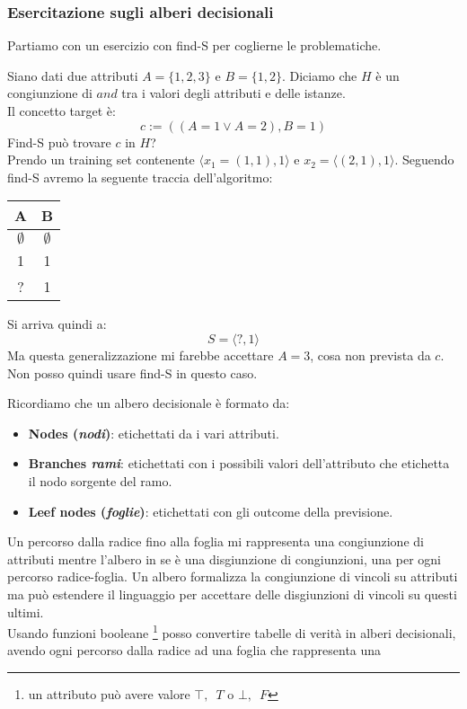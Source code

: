 \subsubsection{Esercitazione sugli alberi decisionali}
Partiamo con un esercizio con find-S per coglierne le problematiche.
\begin{esercizio}
  Siano dati due attributi $A=\{1,2,3\}$ e $B=\{1,2\}$. Diciamo che $H$ è un
  congiunzione di $and$ tra i valori degli attributi e delle istanze.\\
  Il concetto target è:
  \[c:=((A=1\lor A=2), B=1)\]
  Find-S può trovare $c$ in $H$?\\
  Prendo un training set contenente $\langle x_1=(1,1), 1\rangle$ e
  $x_2=\langle(2,1),1\rangle$. Seguendo find-S 
  avremo la seguente traccia dell'algoritmo:
  \begin{table}[H]
    \centering
    \begin{tabular}{c|c}
      A & B\\
      \hline
      $\emptyset$ & $\emptyset$\\
      1 & 1 \\
      ? & 1
    \end{tabular}
  \end{table}
  Si arriva quindi a:
  \[S=\langle ?,1\rangle\]
  Ma questa generalizzazione mi farebbe accettare $A=3$, cosa non prevista da
  $c$.\\
  Non posso quindi usare find-S in questo caso.
\end{esercizio}
Ricordiamo che un albero decisionale è formato da:
\begin{itemize}
  \item \textbf{Nodes (\textit{nodi})}: etichettati da i vari attributi.
  \item \textbf{Branches \textit{rami}}: etichettati con i possibili valori
  dell'attributo che etichetta il nodo sorgente del ramo.
  \item \textbf{Leef nodes (\textit{foglie})}: etichettati con gli outcome della
  previsione.
\end{itemize}
Un percorso dalla radice fino alla foglia mi rappresenta una congiunzione di
attributi mentre l'albero in se è una disgiunzione di congiunzioni, una
per ogni percorso radice-foglia. Un albero formalizza la congiunzione di
vincoli su attributi ma può estendere il linguaggio per accettare delle disgiunzioni di vincoli su questi ultimi.\\
Usando funzioni booleane \footnote{un attributo può avere valore $\top,\,\,\,T$ o
$\bot,\,\,\,F$} posso convertire tabelle di verità in alberi decisionali, avendo ogni percorso dalla radice ad una foglia che rappresenta una
